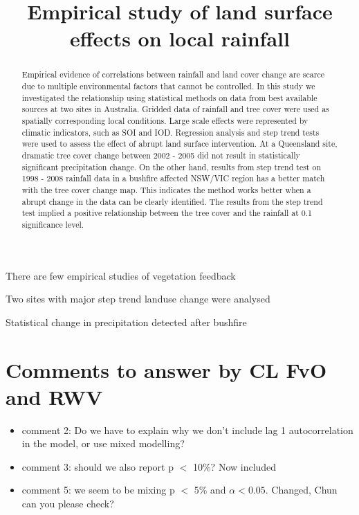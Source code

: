 \documentclass[draft,linenumbers]{agujournal}
\begin{document}


\title{Empirical study of land surface effects on local rainfall}




\begin{keypoints}
\item There are few empirical studies of vegetation feedback 
\item Two sites with major step trend landuse change were analysed
\item Statistical change in precipitation detected after bushfire
\end{keypoints}


\begin{abstract}
Empirical evidence of correlations between rainfall and land cover change are scarce due to multiple environmental factors that cannot be controlled. In this study we investigated the relationship using statistical methods on data from best available sources at two sites in Australia. Gridded data of rainfall and tree cover were used as spatially corresponding local conditions. Large scale effects were represented by climatic indicators, such as SOI and IOD. Regression analysis and step trend tests were used to assess the effect of abrupt land surface intervention. At a Queensland site, dramatic tree cover change between 2002 - 2005 did not result in statistically significant precipitation change. On the other hand, results from step trend test on 1998 - 2008 rainfall data in a bushfire affected NSW/VIC region has a better match with the tree cover change map. This indicates the method works better when a abrupt change in the data can be clearly identified. The results from the step trend test implied a positive relationship between the tree cover and the rainfall at 0.1 significance level. 
\end{abstract}

\section{Comments to answer by CL FvO and RWV}

\begin{itemize}
  \item comment 2: Do we have to explain why we don't include lag 1 autocorrelation in the model, or use mixed modelling?  
  \item comment 3: should we also report p $<$ 10\%? Now included
  \item comment 5: we seem to be mixing p $<$ 5\% and $\alpha < 0.05$. Changed, Chun can you please check?
\end{itemize}
\end{document}
